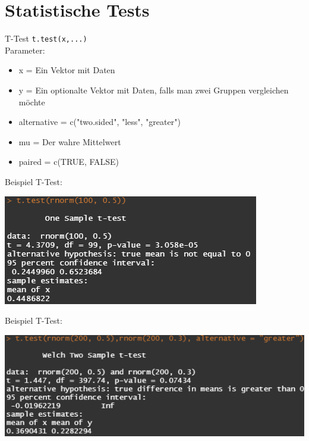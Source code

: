 \documentclass[xcolor=dvipsnames, aspectratio = 169]{beamer}
\begin{document}
\section{Statistische Tests}
\begin{frame}[fragile]{T-Test}
\verb+t.test(x,...)+\\
Parameter:
	\begin{itemize}
		\item x = Ein Vektor mit Daten
		\item y = Ein optionalte Vektor mit Daten, falls man zwei Gruppen vergleichen möchte
		\item alternative = c("two.sided", "less", "greater")
		\item mu = Der wahre Mittelwert
		\item paired = c(TRUE, FALSE)
	\end{itemize}
\end{frame}

\begin{frame}[fragile]{Beispiel T-Test:}	
	\begin{center}
		\includegraphics{OneSampleTtest}
	\end{center}
\end{frame}

\begin{frame}[fragile]{Beispiel T-Test:}	
	\begin{center}
		\includegraphics{TwoSampleTtest}
	\end{center}
\end{frame}
\end{document}
